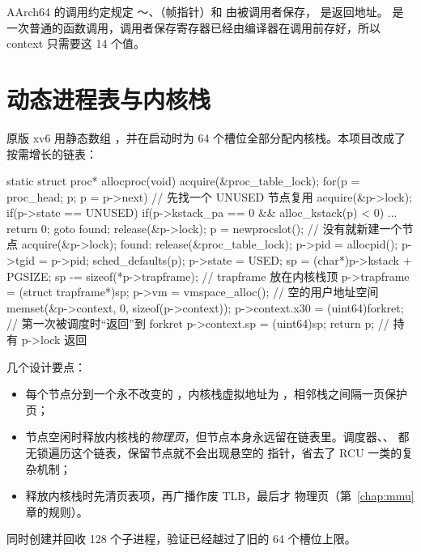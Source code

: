 AArch64 的调用约定规定 ～、（帧指针）和  由被调用者保存， 是返回地址。 是一次普通的函数调用，调用者保存寄存器已经由编译器在调用前存好，所以 context 只需要这 14 个值。

\section{动态进程表与内核栈}

原版 xv6 用静态数组 ，并在启动时为 64 个槽位全部分配内核栈。本项目改成了按需增长的链表：

\begin{ccode}
static struct proc* allocproc(void) {
  acquire(&proc_table_lock);
  for(p = proc_head; p; p = p->next) {        // 先找一个 UNUSED 节点复用
    acquire(&p->lock);
    if(p->state == UNUSED) {
      if(p->kstack_pa == 0 && alloc_kstack(p) < 0) { ... return 0; }
      goto found;
    }
    release(&p->lock);
  }
  p = newprocslot();                           // 没有就新建一个节点
  acquire(&p->lock);
found:
  release(&proc_table_lock);
  p->pid = allocpid();  p->tgid = p->pid;
  sched_defaults(p);
  p->state = USED;
  sp = (char*)p->kstack + PGSIZE;
  sp -= sizeof(*p->trapframe);                 // trapframe 放在内核栈顶
  p->trapframe = (struct trapframe*)sp;
  p->vm = vmspace_alloc();                     // 空的用户地址空间
  memset(&p->context, 0, sizeof(p->context));
  p->context.x30 = (uint64)forkret;            // 第一次被调度时“返回”到 forkret
  p->context.sp  = (uint64)sp;
  return p;                                    // 持有 p->lock 返回
}
\end{ccode}

几个设计要点：

\begin{itemize}
  \item 每个节点分到一个永不改变的 ，内核栈虚拟地址为 ，相邻栈之间隔一页保护页；
  \item 节点空闲时释放内核栈的\emph{物理页}，但节点本身永远留在链表里。调度器、、 都无锁遍历这个链表，保留节点就不会出现悬空的  指针，省去了 RCU 一类的复杂机制；
  \item 释放内核栈时先清页表项，再广播作废 TLB，最后才  物理页（第~\ref{chap:mmu} 章的规则）。
\end{itemize}

 同时创建并回收 128 个子进程，验证已经越过了旧的 64 个槽位上限。

